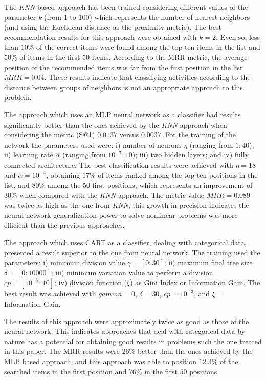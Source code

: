 \documentclass[10pt,letterpaper]{article}
\begin{document}
The \emph{KNN}  based approach has been trained considering different values ​​of the parameter \emph{k} (from 1 to 100) which represents the number of nearest neighbors (and using the Euclidean distance as the proximity metric). The best recommendation results for this approach were obtained with \(k = 2\). Even so, less than \(10​​\%\) of the correct items were found among the top ten items in the list and \(50\%\) of items in the first 50 items. According to the MRR metric, the average position of the recommended items was far from the first position in the list \(MRR = 0.04\). These results indicate that classifying activities according to the distance between groups of neighbors is not an appropriate approach to this problem.

The approach which uses an MLP neural network as a classifier had results significantly better than the ones achieved by the \emph{KNN} approach when considering the metric (S@1) \(0.0137\) versus \(0.0037\). For the training of the network the parameters used were: i) number of neurons \(\eta\) (ranging from \(1:40\)); ii) learning rate \(\alpha\) (ranging from \(10^{-7}: 10\)); iii) two hidden layers; and iv) fully connected architecture. The best classification results were achieved with \(\eta = 18\) and \(\alpha = 10^{-4}\), obtaining \(17\%\) of items ranked among the top ten positions in the list, and \(80\%\) among the \(50\) first positions, which represents an improvement of \(30\%\) when compared with the \emph{KNN} approach. The metric value \(MRR = 0.089\) was twice as high as the one from \emph{KNN}, this growth in precision indicates the neural network generalization power to solve nonlinear problems was more efficient than the previous approaches.

The approach which uses CART as a classifier, dealing with categorical data, presented a result superior to the one from neural network. The training used the parameters: i) minimum division value \(\gamma = [0:30]\); ii) maximum final tree size \(\delta = [0:10000]\); iii) minimum variation value to perform a division \(cp = [10^{-7}:10]\); iv) division function (\(\xi\)) as Gini Index or Information Gain. The best result was achieved with \(gamma = 0\), \(\delta = 30\), \(cp = 10^{-3} \), and \(\xi = \) Information Gain.

The results of this approach were approximately twice as good as those of the neural network. This indicates approaches that deal with categorical data by nature has a potential for obtaining good results in problems such the one treated in this paper. The MRR results were \(26\%\) better than the ones achieved by the MLP based approach, and this approach was able to position \(12.3\%\) of the searched items in the first position and 76\% in the first \(50\) positions.
\end{document}
